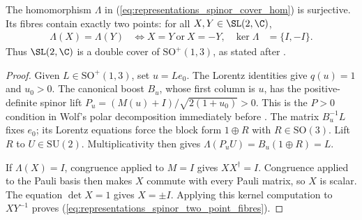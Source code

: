 \begin{theorem}
    \label{thm:spinor_epimorphism_two_point_fibres}
    \leanok
    The homomorphism $\Lambda$ in
    (\ref{eq:representations_spinor_cover_hom}) is surjective.  Its fibres
    contain exactly two points: for all $X,Y\in\SL(2,\C)$,
    \begin{align}
        \Lambda(X)=\Lambda(Y)
        &\iff X=Y\ \text{or}\ X=-Y,
        &\ker\Lambda&=\{I,-I\}.
        \label{eq:representations_spinor_two_point_fibres}
    \end{align}
    Thus $\SL(2,\C)$ is a double cover of $\mathrm{SO}^+(1,3)$, as stated
    after \cite[Eq.~(2.42)]{Wolf2012Quantum}.
\end{theorem}

\begin{proof}\leanok
    Given $L\in\mathrm{SO}^+(1,3)$, set $u=Le_0$.  The Lorentz identities
    give $q(u)=1$ and $u_0>0$.  The canonical boost $B_u$, whose first column
    is $u$, has the positive-definite spinor lift
    $P_u=(M(u)+I)/\sqrt{2(1+u_0)}>0$.  This is the $P>0$ condition in Wolf's
    polar decomposition immediately before \cite[Eq.~(2.44)]{Wolf2012Quantum}.
    The matrix $B_u^{-1}L$ fixes $e_0$;
    its Lorentz equations force the block form $1\oplus R$ with
    $R\in\mathrm{SO}(3)$.  Lift $R$ to $U\in\mathrm{SU}(2)$.  Multiplicativity
    then gives $\Lambda(P_uU)=B_u(1\oplus R)=L$.

    If $\Lambda(X)=I$, congruence applied to $M=I$ gives $XX^\dagger=I$.
    Congruence applied to the Pauli basis then makes $X$ commute with every
    Pauli matrix, so $X$ is scalar.  The equation $\det X=1$ gives
    $X=\pm I$.  Applying this kernel computation to $XY^{-1}$ proves
    (\ref{eq:representations_spinor_two_point_fibres}).
\end{proof}

